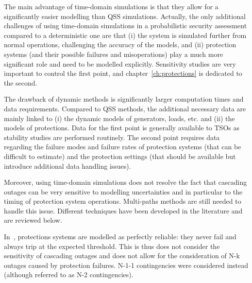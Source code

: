 
The main advantage of time-domain simulations is that they allow for a significantly easier modelling than QSS simulations. Actually, the only additional challenges of using time-domain simulations in a probabilistic security assessment compared to a deterministic one are that (i) the system is simulated further from normal operations, challenging the accuracy of the models, and (ii) protection systems (and their possible failures and misoperations) play a much more significant role and need to be modelled explicitly. Sensitivity studies are very important to control the first point, and chapter~\ref{ch:protections} is dedicated to the second.

The drawback of dynamic methods is significantly larger computation times and data requirements. Compared to QSS methods, the additional necessary data are mainly linked to (i) the dynamic models of generators, loads, etc. and (ii) the models of protections. Data for the first point is generally available to TSOs as stability studies are performed routinely.  The second point requires data regarding the failure modes and failure rates of protection systems (that can be difficult to estimate) and the protection settings (that should be available but introduce additional data handling issues).

Moreover, using time-domain simulations does not resolve the fact that cascading outages can be very sensitive to modelling uncertainties and in particular to the timing of protection system operations. Multi-paths methods are still needed to handle this issue. Different techniques have been developed in the literature and are reviewed below.

In~\cite{SongThesis, SongPaper, Preece1000RandomDynN-2}, protections systems are modelled as perfectly reliable: they never fail and always trip at the expected threshold. This is thus does not consider the sensitivity of cascading outages and does not allow for the consideration of N-k outages caused by protection failures. N-1-1 contingencies were considered instead (although referred to as N-2 contingencies).

